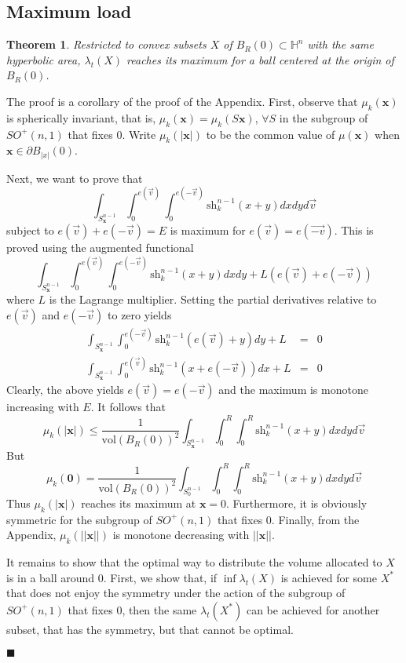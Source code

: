 \documentclass{article}
\newcommand{\x}{{\mathbf x}}
\newcommand{\vol}{\mathrm{vol}}
\newcommand{\sh}{\mathrm{sh}}
\newtheorem{theorem}{Theorem}
\newenvironment{proof}
{\noindent {\bf Proof.}}
{$\blacksquare$}
\begin{document}
\noindent 

\noindent 
\subsection{Maximum load}

\begin{theorem}
\label{t:max_traffic}
Restricted to convex subsets $X$ of $B_R(0) \subset \mathbb{H}^n$ with the same hyperbolic area, 
$\lambda _{t} (X)$ reaches its maximum for a ball centered at the origin of $B_R(0)$. 
\end{theorem}

\noindent 

\begin{proof} 
The proof is a corollary of the proof of the Appendix. 
First, observe that $\mu_k(\x)$ is spherically invariant, that is, $\mu_k(\x)=\mu_k(S\x)$, 
$\forall S$ in the subgroup of $SO^+(n,1)$ that fixes $0$. 
Write $\mu_k(|\x|)$ to be the common value of $\mu(\x)$ when 
$\x \in \partial B_{|x|}(0)$. 

Next, we want to prove that 
\[\int_{S_\x^{n-1}} \int_0^{e(\vec{v})}\int_0^{e(-\vec{v})}\sh_k^{n-1}(x+y)dxdyd\vec{v} \]
subject to $e(\vec{v})+e(-\vec{v})=E$ is maximum for $e(\vec{v})=e(\vec{-v})$. 
This is proved using the augmented functional 
\[\int_{S_\x^{n-1}} \int_0^{e(\vec{v})}\int_0^{e(-\vec{v})}\sh_k^{n-1}(x+y)dxdy 
 +L(e(\vec{v})+e(-\vec{v}))\]
where $L$ is the Lagrange multiplier. 
Setting the partial derivatives relative to $e(\vec{v})$ and $e(-\vec{v})$ to zero yields
\begin{eqnarray*}
\int_{S_\x^{n-1}} \int_0^{e(-\vec{v})}\sh_k^{n-1}(e(\vec{v})+y)dy+L&=&0\\
\int_{S_\x^{n-1}} \int_0^{e(\vec{v})}\sh_k^{n-1}(x+e(-\vec{v}))dx+L&=&0
\end{eqnarray*}
Clearly, the above yields $e(\vec{v})=e(-\vec{v})$ 
and the maximum is monotone increasing with $E$. It follows that 
\[\mu_k(|\x|)\leq \frac{1}{\vol(B_R(0))^2}
\int_{S_\x^{n-1}} \int_0^R\int_0^R\sh_k^{n-1}(x+y)dxdyd\vec{v}\]
But 
\[\mu_k(\textbf{0})=\frac{1}{\vol(B_R(0))^2}
\int_{S_0^{n-1}} \int_0^R\int_0^R\sh_k^{n-1}(x+y)dxdyd\vec{v}\]
Thus $\mu_k(|\x|)$ reaches its maximum at $\x=0$. 
Furthermore, it is obviously symmetric for the subgroup of $SO^+(n,1)$ that fixes $0$. 
Finally, from the Appendix, $\mu_k(||\x||)$ is monotone decreasing with $||\x||$. 

It remains to show that the optimal way to distribute the volume allocated to $X$ 
is in a ball around $0$. First, we show that, if $\inf \lambda_t(X)$ is achieved for some $X^*$ 
that does not enjoy the symmetry under the action of the subgroup of $SO^+(n,1)$ that fixes $0$, 
then the same $\lambda_t(X^*)$ can be achieved for another subset, that has the symmetry, but that cannot be optimal.  



\end{proof}
\end{document}
